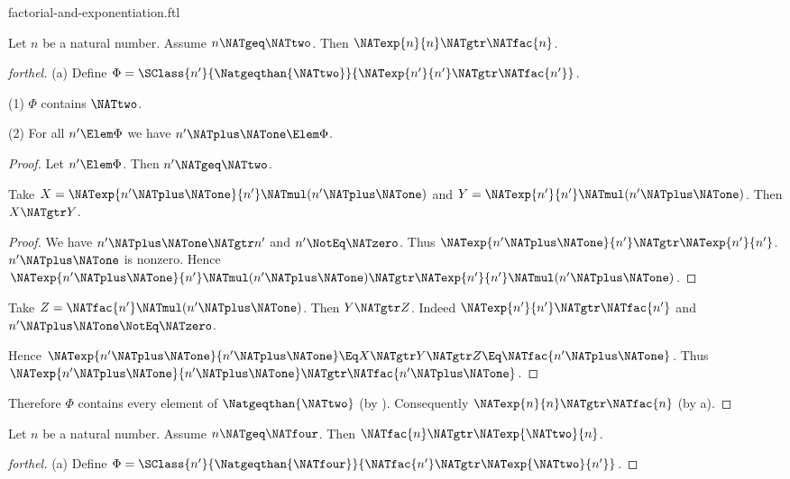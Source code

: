 \documentclass{stex}
\begin{document}
\begin{smodule}{factorial-and-exponentiation.ftl}

\begin{proposition}[forthel]
  Let $n$ be a natural number.
  Assume $n \NATgeq \NATtwo$.
  Then $\NATexp{n}{n} \NATgtr \NATfac{n}$.
\end{proposition}
\begin{proof}[forthel]
  (a) Define $\Phi = \SClass{n'}{\Natgeqthan{\NATtwo}}{\NATexp{n'}{n'} \NATgtr \NATfac{n'}}$.

  (1) $\Phi$ contains $\NATtwo$.

  (2) For all $n' \Elem \Phi$ we have $n' \NATplus \NATone \Elem \Phi$.
  \begin{proof}
    Let $n' \Elem \Phi$.
    Then $n' \NATgeq \NATtwo$.

    Take $X = \NATexp{n' \NATplus \NATone}{n'} \NATmul (n' \NATplus \NATone)$ and $Y = \NATexp{n'}{n'} \NATmul (n' \NATplus \NATone)$.
    Then $X \NATgtr Y$.
    \begin{proof}
      We have $n' \NATplus \NATone \NATgtr n'$ and $n' \NotEq \NATzero$.
      Thus $\NATexp{n' \NATplus \NATone}{n'} \NATgtr \NATexp{n'}{n'}$.
      $n' \NATplus \NATone$ is nonzero.
      Hence $\NATexp{n' \NATplus \NATone}{n'} \NATmul (n' \NATplus \NATone) \NATgtr \NATexp{n'}{n'} \NATmul (n' \NATplus \NATone)$.
    \end{proof}

    Take $Z = \NATfac{n'} \NATmul (n' \NATplus \NATone)$.
    Then $Y \NATgtr Z$.
    Indeed $\NATexp{n'}{n'} \NATgtr \NATfac{n'}$ and $n' \NATplus \NATone \NotEq \NATzero$.

    Hence $\NATexp{n' \NATplus \NATone}{n' \NATplus \NATone} \Eq X \NATgtr Y \NATgtr Z \Eq \NATfac{n' \NATplus \NATone}$.
    Thus $\NATexp{n' \NATplus \NATone}{n' \NATplus \NATone} \NATgtr \NATfac{n' \NATplus \NATone}$.
  \end{proof}

  Therefore $\Phi$ contains every element of $\Natgeqthan{\NATtwo}$ (by ).
  Consequently $\NATexp{n}{n} \NATgtr \NATfac{n}$ (by a).
\end{proof}

\begin{proposition}[forthel]
  Let $n$ be a natural number.
  Assume $n \NATgeq \NATfour$.
  Then $\NATfac{n} \NATgtr \NATexp{\NATtwo}{n}$.
\end{proposition}
\begin{proof}[forthel]
  (a) Define $\Phi = \SClass{n'}{\Natgeqthan{\NATfour}}{\NATfac{n'} \NATgtr \NATexp{\NATtwo}{n'}}$.


\end{proof}
\end{smodule}
\end{document}
